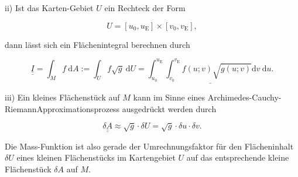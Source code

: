 \documentclass[10pt]{article}
\begin{document}
ii) Ist das Karten-Gebiet $U$ ein Rechteck der Form


\begin{equation*}
U=\left[u_{0}, u_{\mathrm{E}}\right] \times\left[v_{0}, v_{\mathrm{E}}\right], \tag{2.118}
\end{equation*}


dann lässt sich ein Flächenintegral berechnen durch


\begin{equation*}
\underline{\underline{I}}=\int_{M} f \mathrm{~d} A:=\int_{U} f \sqrt{g} \mathrm{~d} U=\underline{\int_{u_{0}}^{u_{\mathrm{E}}} \int_{v_{0}}^{v_{\mathrm{E}}} f(u ; v) \sqrt{g(u ; v)} \mathrm{d} v \mathrm{~d} u .} \tag{2.119}
\end{equation*}


iii) Ein kleines Flächenstück auf $M$ kann im Sinne eines Archimedes-Cauchy-RiemannApproximationsprozess ausgedrückt werden durch


\begin{equation*}
\underline{\underline{\delta A}} \approx \sqrt{g} \cdot \delta U=\sqrt{g} \cdot \delta u \cdot \delta v . \tag{2.120}
\end{equation*}


Die Mass-Funktion ist also gerade der Umrechnungsfaktor für den Flächeninhalt $\delta U$ eines kleinen Flächenstücks im Kartengebiet $U$ auf das entsprechende kleine Flächenstück $\delta A$ auf $M$.
\end{document}
